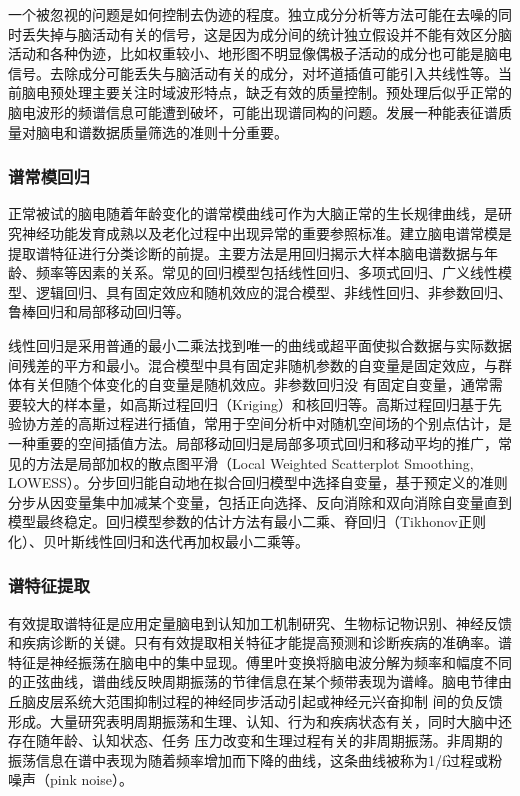 一个被忽视的问题是如何控制去伪迹的程度。独立成分分析等方法可能在去噪的同时丢失掉与脑活动有关的信号，这是因为成分间的统计独立假设并不能有效区分脑活动和各种伪迹，比如权重较小、地形图不明显像偶极子活动的成分也可能是脑电信号。去除成分可能丢失与脑活动有关的成分，对坏道插值可能引入共线性等。当前脑电预处理主要关注时域波形特点，缺乏有效的质量控制。预处理后似乎正常的脑电波形的频谱信息可能遭到破坏，可能出现谱同构的问题。发展一种能表征谱质量对脑电和谱数据质量筛选的准则十分重要。

\subsubsection{谱常模回归}
正常被试的脑电随着年龄变化的谱常模曲线可作为大脑正常的生长规律曲线，是研究神经功能发育成熟以及老化过程中出现异常的重要参照标准。建立脑电谱常模是提取谱特征进行分类诊断的前提。主要方法是用回归揭示大样本脑电谱数据与年龄、频率等因素的关系。常见的回归模型包括线性回归、多项式回归、广义线性模型、逻辑回归、具有固定效应和随机效应的混合模型、非线性回归、非参数回归、鲁棒回归和局部移动回归等。

线性回归是采用普通的最小二乘法找到唯一的曲线或超平面使拟合数据与实际数据间残差的平方和最小。混合模型中具有固定非随机参数的自变量是固定效应，与群体有关但随个体变化的自变量是随机效应。非参数回归没
有固定自变量，通常需要较大的样本量，如高斯过程回归（Kriging）和核回归等。高斯过程回归基于先验协方差的高斯过程进行插值，常用于空间分析中对随机空间场的个别点估计，是一种重要的空间插值方法。局部移动回归是局部多项式回归和移动平均的推广，常见的方法是局部加权的散点图平滑（Local Weighted Scatterplot Smoothing, LOWESS）。分步回归能自动地在拟合回归模型中选择自变量，基于预定义的准则分步从因变量集中加减某个变量，包括正向选择、反向消除和双向消除自变量直到模型最终稳定。回归模型参数的估计方法有最小二乘、脊回归（Tikhonov正则化）、贝叶斯线性回归和迭代再加权最小二乘等。

\subsubsection{谱特征提取}
有效提取谱特征是应用定量脑电到认知加工机制研究、生物标记物识别、神经反馈和疾病诊断的关键。只有有效提取相关特征才能提高预测和诊断疾病的准确率。谱特征是神经振荡在脑电中的集中显现。傅里叶变换将脑电波分解为频率和幅度不同的正弦曲线，谱曲线反映周期振荡的节律信息在某个频带表现为谱峰。脑电节律由丘脑皮层系统大范围抑制过程的神经同步活动引起或神经元兴奋抑制
间的负反馈形成。大量研究表明周期振荡和生理、认知、行为和疾病状态有关，同时大脑中还存在随年龄、认知状态、任务
压力改变和生理过程有关的非周期振荡。非周期的振荡信息在谱中表现为随着频率增加而下降的曲线，这条曲线被称为1/f过程或粉噪声（pink noise）。

